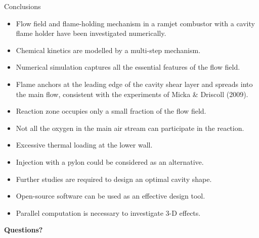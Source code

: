 \documentclass[10pt,aspectratio=43]{beamer}
\begin{document}
\begin{frame}{Conclusions}
  \footnotesize
  \begin{itemize}
    \item Flow field and flame-holding mechanism in a ramjet combustor with
          a cavity flame holder have been investigated numerically.
    \item Chemical kinetics are modelled by a multi-step mechanism.
    \item Numerical simulation captures all the essential features of the
          flow field.
    \item Flame anchors at the leading edge of the cavity shear layer and
          spreads into the main flow, consistent with the experiments of
          Micka \& Driscoll (2009).
    \item Reaction zone occupies only a small fraction of the flow field.
    \item Not all the oxygen in the main air stream can participate in
          the reaction.
    \item Excessive thermal loading at the lower wall.
    \item Injection with a pylon could be considered as an alternative.
    \item Further studies are required to design an optimal cavity shape.
    \item Open-source software can be used as an effective design tool.
    \item Parallel computation is necessary to investigate 3-D effects.
  \end{itemize}
\end{frame}

\begin{frame}[plain]
  \vfill
  \begin{center}
    {\Huge\bfseries Questions?}
  \end{center}
  \vfill
\end{frame}
\end{document}

